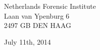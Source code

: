 \begin{titlepage}
\begin{addmargin}[-1cm]{-1cm}
\begin{center}
\vspace{0.25cm}

Netherlands Forensic Institute\\
Laan van Ypenburg 6 \\
2497 GB DEN HAAG 

\vspace{1.5cm}

July 11th, 2014

\end{center}
\end{addmargin}
\end{titlepage}